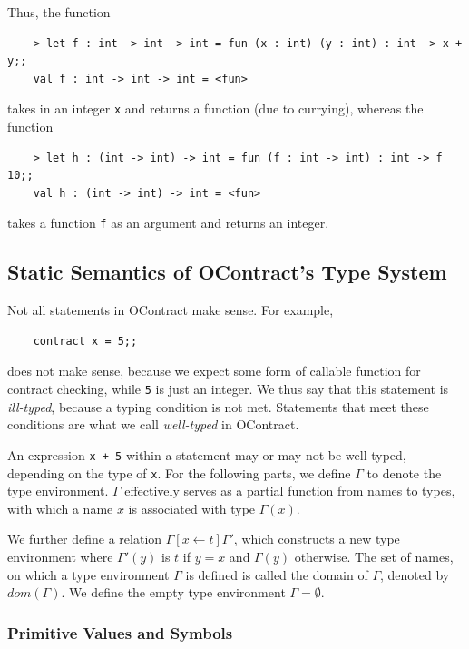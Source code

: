 \documentclass[a4paper]{article}
\begin{document}
Thus, the function

\begin{verbatim}
    > let f : int -> int -> int = fun (x : int) (y : int) : int -> x + y;;
    val f : int -> int -> int = <fun>
\end{verbatim}

takes in an integer \verb|x| and returns a function (due to currying), whereas the function

\begin{verbatim}
    > let h : (int -> int) -> int = fun (f : int -> int) : int -> f 10;;
    val h : (int -> int) -> int = <fun>
\end{verbatim}

takes a function \verb|f| as an argument and returns an integer.

\subsection{Static Semantics of OContract's Type System}

Not all statements in OContract make sense. For example,

\begin{verbatim}
    contract x = 5;;
\end{verbatim}

does not make sense, because we expect some form of callable function for contract checking, while \verb|5| is just an integer.
We thus say that this statement is \textit{ill-typed}, because a typing condition is not met.
Statements that meet these conditions are what we call \textit{well-typed} in OContract.

An expression \verb|x + 5| within a statement may or may not be well-typed, depending on the type of \verb|x|.
For the following parts, we define $\Gamma$ to denote the type environment.
$\Gamma$ effectively serves as a partial function from names to types, with which a name $x$ is associated with type $\Gamma(x)$.

We further define a relation $\Gamma[x\leftarrow t]\Gamma'$, which constructs a new type environment where $\Gamma'(y)$ is $t$ if $y=x$ and $\Gamma(y)$ otherwise.
The set of names, on which a type environment $\Gamma$ is defined is called the domain of $\Gamma$, denoted by $dom(\Gamma)$.
We define the empty type environment $\Gamma=\emptyset$.

\subsubsection{Primitive Values and Symbols}
\end{document}
